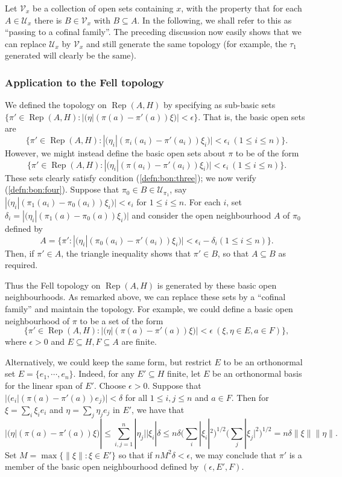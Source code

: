 \documentclass[a4paper,11pt]{article}
\newcommand{\mc}[1]{{\mathcal{#1}}}
\newcommand{\Rep}{\operatorname{Rep}}
\begin{document}
Let $\mc V_x$ be a collection of open sets containing $x$, with the
property that for each $A\in\mc U_x$ there is $B\in\mc V_x$ with $B\subseteq A$.
In the following, we shall refer to this as ``passing to a cofinal family''.
The preceding discussion now easily shows that we can replace $\mc U_x$ by
$\mc V_x$ and still generate the same topology (for example, the $\tau_1$
generated will clearly be the same).


\subsubsection{Application to the Fell topology}

We defined the topology on $\Rep(A,H)$ by specifying as sub-basic sets
$\{ \pi'\in\Rep(A,H) : |(\eta|(\pi(a)-\pi'(a))\xi)|<\epsilon \}$.  That is,
the basic open sets are
\[ \{ \pi'\in\Rep(A,H) : |(\eta_i|(\pi_i(a_i)-\pi'(a_i))\xi_i)|<\epsilon_i 
\ (1\leq i\leq n) \}. \]
However, we might instead define the basic open sets about $\pi$ to be of the
form
\[ \{ \pi'\in\Rep(A,H) : |(\eta_i|(\pi(a_i)-\pi'(a_i))\xi_i)|<\epsilon_i 
\ (1\leq i\leq n) \}. \]
These sets clearly satisfy condition (\ref{defn:bon:three}); we now verify
(\ref{defn:bon:four}).  Suppose that $\pi_0 \in B\in\mc U_{\pi_1}$, say
$|(\eta_i|(\pi_1(a_i)-\pi_0(a_i))\xi_i)|<\epsilon_i$ for $1\leq i\leq n$.  For
each $i$, set $\delta_i = |(\eta_i|(\pi_1(a)-\pi_0(a))\xi_i)|$ and consider the
open neighbourhood $A$ of $\pi_0$ defined by 
\[ A = \{\pi' : |(\eta_i|(\pi_0(a_i)-\pi'(a_i))\xi_i)|<\epsilon_i-\delta_i
(1\leq i\leq n) \}. \]
Then, if $\pi'\in A$, the triangle inequality shows that $\pi'\in B$, so that
$A\subseteq B$ as required.

Thus the Fell topology on $\Rep(A,H)$ is generated by these basic open
neighbourhoods.  As remarked above, we can replace these sets by a ``cofinal
family'' and maintain the topology.  For example, we could define a basic open
neighbourhood of $\pi$ to be a set of the form
\[ \big\{ \pi'\in\Rep(A,H) : |(\eta|(\pi(a)-\pi'(a))\xi)|<\epsilon
\ (\xi,\eta\in E,a\in F) \big\}, \]
where $\epsilon>0$ and $E\subseteq H, F\subseteq A$ are finite.

Alternatively, we could keep the same form, but restrict $E$ to be an
orthonormal set $E=\{e_1,\cdots,e_n\}$.  Indeed, for any $E'\subseteq H$ finite,
let $E$ be an orthonormal basis for the linear span of $E'$.  Choose
$\epsilon>0$.  Suppose that $|(e_i|(\pi(a)-\pi'(a))e_j)|<\delta$ for all
$1\leq i,j\leq n$ and $a\in F$.  Then for $\xi=\sum_i \xi_ie_i$ and
$\eta=\sum_j \eta_je_j$ in $E'$, we have that
\[ |(\eta|(\pi(a)-\pi'(a))\xi)| \leq
\sum_{i,j=1}^n |\eta_j| |\xi_i| \delta
\leq n\delta \Big(\sum_i |\xi_i|^2\Big)^{1/2}
\Big(\sum_j |\xi_j|^2\Big)^{1/2}
= n\delta\|\xi\|\|\eta\|. \]
Set $M=\max\{\|\xi\|:\xi\in E'\}$ so that if $n M^2 \delta < \epsilon$,
we may conclude that $\pi'$ is a member of the basic open neighbourhood defined
by $(\epsilon,E',F)$.
\end{document}

